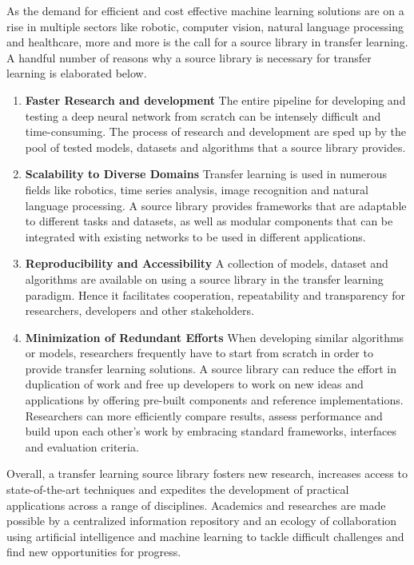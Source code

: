 As the demand for efficient and cost effective machine learning solutions are on a rise in multiple sectors like robotic, computer vision, natural language processing and healthcare, more and more is the call for a source library in transfer learning. A handful number of reasons why a source library is necessary for transfer learning is elaborated below.
\begin{enumerate}
    \item \textbf{Faster Research and development} The entire pipeline for developing and testing a deep neural network from scratch can be intensely difficult and time-consuming. The process of research and development are sped up by the pool of tested models, datasets and algorithms that a source library provides.
    \item \textbf{Scalability to Diverse Domains} Transfer learning is used in numerous fields like robotics, time series analysis, image recognition and natural language processing. A source library provides frameworks that are adaptable to different tasks and datasets, as well as modular components that can be integrated with existing networks to be used in different applications.
    \item \textbf{Reproducibility and Accessibility} A collection of models, dataset and algorithms are available on using a source library in the transfer learning paradigm. Hence it facilitates cooperation, repeatability and transparency for researchers, developers and other stakeholders.
    \item \textbf{Minimization of Redundant Efforts} When developing similar algorithms or models, researchers frequently have to start from scratch in order to provide transfer learning solutions. A source library can reduce the effort in duplication of work and free up developers to work on new ideas and applications by offering pre-built components and reference implementations. Researchers can more efficiently compare results, assess performance and build upon each other's work by embracing standard frameworks, interfaces and evaluation criteria.
\end{enumerate}
Overall, a transfer learning source library fosters new research, increases access to state-of-the-art techniques and expedites the development of practical applications across a range of disciplines. Academics and researches are made possible by a centralized information repository and an ecology of collaboration using artificial intelligence and machine learning to tackle difficult challenges and find new opportunities for progress.

